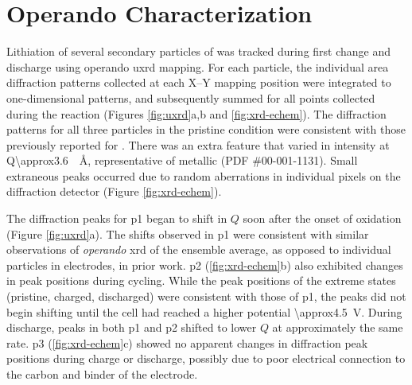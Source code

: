 \documentclass{article}
\begin{document}
\section{Operando Characterization}


Lithiation of several secondary particles of \nca{} was tracked during
first change and discharge using operando \gls{uxrd} mapping. For each
particle, the individual area diffraction patterns collected at each
X--Y mapping position were integrated to one-dimensional patterns, and
subsequently summed for all points collected during the reaction
(Figures \ref{fig:uxrd}a,b and \ref{fig:xrd-echem}). The diffraction
patterns for all three particles in the pristine condition were
consistent with those previously reported for \nca{}
\cite{novak2015}. There was an extra feature that varied in
intensity at Q\SI{\approx3.6}{\per\angstrom}, representative of
metallic  (PDF \#00-001-1131). Small extraneous peaks occurred
due to random aberrations in individual pixels on the diffraction
detector (Figure \ref{fig:xrd-echem}).

The diffraction peaks for \gls{p1} began to shift in $Q$ soon after
the onset of oxidation (Figure \ref{fig:uxrd}a). The shifts observed
in \gls{p1} were consistent with similar observations of
\emph{operando} \gls{xrd} of the ensemble average\cite{robert2015},
as opposed to individual particles in \nca{} electrodes, in prior
work\cite{grenier2017}. \gls{p2} (\ref{fig:xrd-echem}b) also
exhibited changes in peak positions during cycling. While the peak
positions of the extreme states (pristine, charged, discharged) were
consistent with those of \gls{p1}, the peaks did not begin shifting
until the cell had reached a higher potential
\SI{\approx4.5}{\volt}. During discharge, peaks in both \gls{p1} and
\gls{p2} shifted to lower $Q$ at approximately the same rate. \gls{p3}
(\ref{fig:xrd-echem}c) showed no apparent changes in diffraction peak
positions during charge or discharge, possibly due to poor electrical
connection to the carbon and binder of the electrode.
\end{document}
